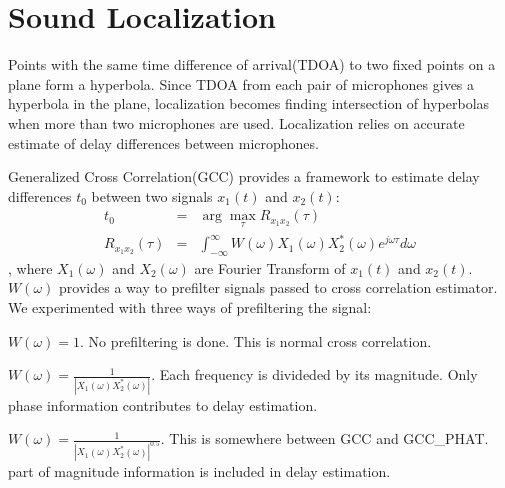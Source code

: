 \section{Sound Localization}
Points with the same time difference of arrival(TDOA) to two fixed points on a plane form a hyperbola. Since TDOA from each pair of microphones gives a hyperbola in the plane, localization becomes finding intersection of hyperbolas when more than two microphones are used. Localization relies on accurate estimate of delay differences between microphones.

Generalized Cross Correlation(GCC) provides a framework to estimate delay differences $t_0$ between two signals $x_1(t)$ and $x_2(t)$:
\begin{eqnarray} \label{eq:gcc}
t_0 &=& \arg\max_{\tau} R_{x_1x_2}(\tau) \\
R_{x_1x_2}(\tau) &=& \int_{-\infty}^\infty W(\omega) X_1(\omega) X_2^{*}(\omega) e^{j\omega\tau} d\omega
\end{eqnarray}
, where $X_1(\omega)$ and $X_2(\omega)$ are Fourier Transform of $x_1(t)$ and $x_2(t)$. $W(\omega)$ provides a way to prefilter signals passed to cross correlation estimator. We experimented with three ways of prefiltering the signal:
\begin{description}
\item[GCC] $W(\omega) = 1$. No prefiltering is done. This is normal cross correlation.
\item[GCC\_PHAT] $W(\omega) = \frac{1}{\left|X_1(\omega)X_2^{*}(\omega)\right|}$. Each frequency is divideded by its magnitude. Only phase information contributes to delay estimation.
\item[GCC\_PHAT\_SQRT] $W(\omega) = \frac{1}{\left|X_1(\omega)X_2^*(\omega)\right|^{0.5}}$. This is somewhere between GCC and GCC\_PHAT. part of magnitude information is included in delay estimation.
\end{description}
